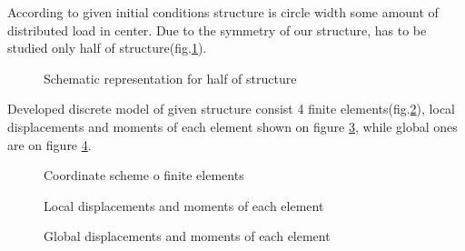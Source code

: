 According to given initial conditions structure is circle width some amount of distributed load in
center. Due to the symmetry of our structure, has to be studied only half of
structure(fig.\ref{fig:halfModel}).
\begin{figure}[H]
    \centering
        
    \caption{Schematic representation for half of structure}\label{fig:halfModel}      
\end{figure}
Developed discrete model of given structure consist 4 finite elements(fig.\ref{fig:coords}), local
displacements and moments of each element shown on figure \ref{fig:localDispl}, while global ones
are on figure \ref{fig:globDispl}.
\begin{figure}[H]
    \centering
        
    \caption{Coordinate scheme o finite elements}\label{fig:coords}      
\end{figure}
\begin{figure}[H]
    \centering
        
    \caption{Local displacements and moments of each element}\label{fig:localDispl}      
\end{figure}
\begin{figure}[H]
    \centering
        
    \caption{Global displacements and moments of each element}\label{fig:globDispl}      
\end{figure}